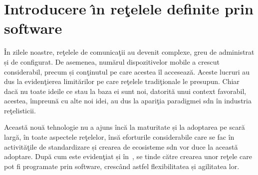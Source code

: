 \chapter{Introducere \^{\i}n reţelele definite prin software\label{ch:introducere_sdn}}

\graphicspath{ {cap-introducere_in_sdn/figures/} }

În zilele noastre, reţelele de comunicaţii au devenit complexe, greu de administrat și de configurat. De asemenea, numărul dispozitivelor mobile a crescut considerabil, precum și conţinutul pe care acestea îl accesează. Aceste lucruri au dus la evidenţierea limitărilor pe care reţelele tradiţionale le presupun. Chiar dacă nu toate ideile ce stau la baza ei sunt noi, datorită unui context favorabil, acestea, împreună cu alte noi idei, au dus la apariţia paradigmei \gls{sdn} în industria reţelisticii.

Această nouă tehnologie nu a ajuns încă la maturitate și la adoptarea pe scară largă, în toate aspectele reţelelor, însă eforturile considerabile care se fac în activităţile de standardizare și crearea de ecosisteme \gls{sdn} vor duce la această adoptare. După cum este evidenţiat și în~\cite{nadeau2013sdn}, se tinde către crearea unor reţele care pot fi programate prin software, crescând astfel flexibilitatea și agilitatea lor.





